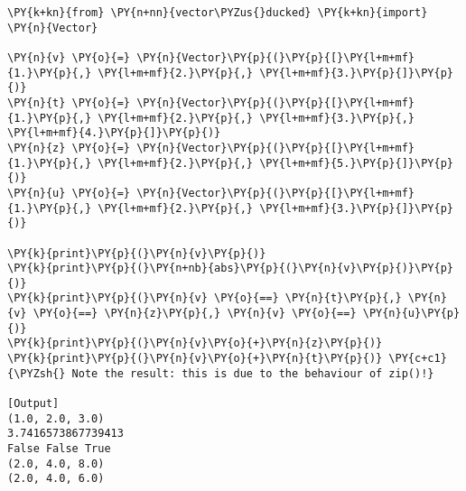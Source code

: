 \begin{Verbatim}[label=\makebox{\url{https://github.com/lucabaldini/cmepda/tree/master/slides/latex/snippets/test\_vector\_ducked.py}},commandchars=\\\{\}]
\PY{k+kn}{from} \PY{n+nn}{vector\PYZus{}ducked} \PY{k+kn}{import} \PY{n}{Vector}
       
\PY{n}{v} \PY{o}{=} \PY{n}{Vector}\PY{p}{(}\PY{p}{[}\PY{l+m+mf}{1.}\PY{p}{,} \PY{l+m+mf}{2.}\PY{p}{,} \PY{l+m+mf}{3.}\PY{p}{]}\PY{p}{)}
\PY{n}{t} \PY{o}{=} \PY{n}{Vector}\PY{p}{(}\PY{p}{[}\PY{l+m+mf}{1.}\PY{p}{,} \PY{l+m+mf}{2.}\PY{p}{,} \PY{l+m+mf}{3.}\PY{p}{,} \PY{l+m+mf}{4.}\PY{p}{]}\PY{p}{)}
\PY{n}{z} \PY{o}{=} \PY{n}{Vector}\PY{p}{(}\PY{p}{[}\PY{l+m+mf}{1.}\PY{p}{,} \PY{l+m+mf}{2.}\PY{p}{,} \PY{l+m+mf}{5.}\PY{p}{]}\PY{p}{)}
\PY{n}{u} \PY{o}{=} \PY{n}{Vector}\PY{p}{(}\PY{p}{[}\PY{l+m+mf}{1.}\PY{p}{,} \PY{l+m+mf}{2.}\PY{p}{,} \PY{l+m+mf}{3.}\PY{p}{]}\PY{p}{)}

\PY{k}{print}\PY{p}{(}\PY{n}{v}\PY{p}{)}
\PY{k}{print}\PY{p}{(}\PY{n+nb}{abs}\PY{p}{(}\PY{n}{v}\PY{p}{)}\PY{p}{)}
\PY{k}{print}\PY{p}{(}\PY{n}{v} \PY{o}{==} \PY{n}{t}\PY{p}{,} \PY{n}{v} \PY{o}{==} \PY{n}{z}\PY{p}{,} \PY{n}{v} \PY{o}{==} \PY{n}{u}\PY{p}{)}
\PY{k}{print}\PY{p}{(}\PY{n}{v}\PY{o}{+}\PY{n}{z}\PY{p}{)}
\PY{k}{print}\PY{p}{(}\PY{n}{v}\PY{o}{+}\PY{n}{t}\PY{p}{)} \PY{c+c1}{\PYZsh{} Note the result: this is due to the behaviour of zip()!}

[Output]
(1.0, 2.0, 3.0)
3.7416573867739413
False False True
(2.0, 4.0, 8.0)
(2.0, 4.0, 6.0)
\end{Verbatim}
